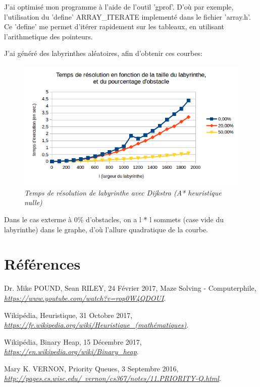 \documentclass[a4paper,10pt]{article}
\begin{document}
	
	J'ai optimisé mon programme à l'aide de l'outil 'gprof'.
	D'où par exemple, l'utilisation du 'define' ARRAY\_ITERATE implementé dans le fichier 'array.h'.
	Ce 'define' me permet d'itérer rapidement sur les tableaux, en utilisant l'arithmetique des pointeurs.\newline
	
	J'ai généré des labyrinthes aléatoires, afin d'obtenir ces courbes:
	\begin{figure}
	  \begin{center}
	    \includegraphics[width=12cm,height=\textheight,keepaspectratio]{./images/courbe_temps.png}
	  \end{center}
	  \caption{\textit{Temps de résolution de labyrinthe avec Dijkstra (A* heuristique nulle)}}
	\end{figure}
	Dans le cas exterme à 0\% d'obstacles, on a l * l sommets (case vide du labyrinthe) dans le graphe,
	d'où l'allure quadratique de la courbe.
  \section{Références}
    \begin{thebibliography}{}
      	Dr. Mike POUND, Sean RILEY, 24 Février 2017,\newline
      	Maze Solving - Computerphile,\newline
	\href{https://www.youtube.com/watch?v=rop0W4QDOUI}{\textit{https://www.youtube.com/watch?v=rop0W4QDOUI}}.
	
	Wikipédia, Heuristique, 31 Octobre 2017,\newline
	\href{https://fr.wikipedia.org/wiki/Heuristique_(mathématiques)}{\textit{https://fr.wikipedia.org/wiki/Heuristique\_(mathématiques)}}.
	
	Wikipédia, Binary Heap, 15 Décembre 2017,\newline
	\href{https://en.wikipedia.org/wiki/Binary\_heap}{\textit{https://en.wikipedia.org/wiki/Binary\_heap}}.

	Mary K. VERNON, Priority Queues, 3 Septembre 2016,\newline
	\href{http://pages.cs.wisc.edu/~vernon/cs367/notes/11.PRIORITY-Q.html}{\textit{http://pages.cs.wisc.edu/~vernon/cs367/notes/11.PRIORITY-Q.html}}.

  \end{thebibliography}
    
\end{document}
